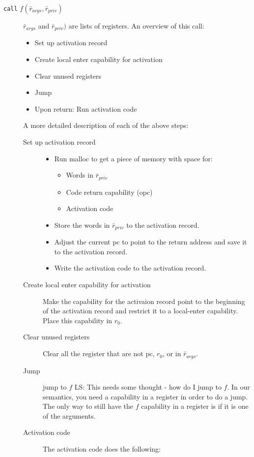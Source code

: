 \documentclass[a4paper]{article}
\newcommand\lau[1]{{\color{purple} \sf \footnotesize {LS: #1}}\\}
\newcommand{\var}[1]{\mathit{#1}}
\newcommand{\pcreg}{\mathrm{pc}}
\begin{document}
\begin{description}
\item[\texttt{call} $f(\bar{r}_{\var{args}},\bar{r}_{\var{priv}})$] $\bar{r}_{\var{args}}$ and $\bar{r}_{\var{priv}})$ are lists of registers. An overview of this call:
  \begin{itemize}
  \item Set up activation record
  \item Create local enter capability for activation
  \item Clear unused registers
  \item Jump
  \item Upon return: Run activation code
  \end{itemize}
A more detailed description of each of the above steps:
\begin{description}
  \item [Set up activation record]
    \begin{itemize}
    \item Run malloc to get a piece of memory with space for:
    \begin{itemize}
      \item Words in $\bar{r}_{\var{priv}}$
      \item Code return capability (opc)
      \item Activation code
    \end{itemize}
    \item Store the words in $\bar{r}_{\var{priv}}$ to the activation record. 
    \item Adjust the current pc to point to the return address and save it to the activation record.
    \item Write the activation code to the activation record.
  \end{itemize}
  \item [Create local enter capability for activation] Make the capability for the activaion record point to the beginning of the activation record and restrict it to a local-enter capability. Place this capability in $r_0$.
  \item [Clear unused registers]
    Clear all the register that are not $\pcreg$, $r_0$, or in $\bar{r}_{\var{args}}$.
  \item [Jump] jump to $f$
\lau{This needs some thought - how do I jump to $f$. In our semantics, you need a capability in a register in order to do a jump. The only way to still have the $f$ capability in a register is if it is one of the arguments.}
  \item [Activation code] The activation code does the following:

\end{description}
\end{description}
\end{document}
